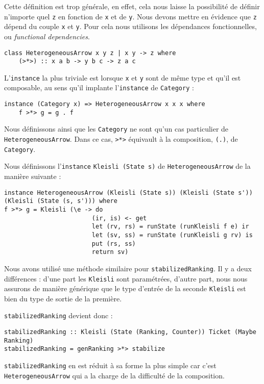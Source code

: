 \documentclass{llncs}
\newcommand{\HA}{\lstinline{HeterogeneousArrow} }
\newcommand{\HAp}{\lstinline{HeterogeneousArrow}. }
\begin{document}
Cette définition est trop générale, en effet, cela nous laisse la possibilité de
définir n'importe quel \lstinline{z} en fonction de \lstinline{x} et de \lstinline{y}.
Nous devons mettre en évidence que \lstinline{z} dépend du couple \lstinline{x} et \lstinline{y}.
Pour cela nous utilisons les dépendances fonctionnelles, ou \emph{functional dependencies}.
\begin{lstlisting}
class HeterogeneousArrow x y z | x y -> z where
    (>*>) :: x a b -> y b c -> z a c
\end{lstlisting}

L'\lstinline{instance} la plus triviale est lorsque \lstinline{x} et \lstinline{y}
sont de même type et qu'il est composable, au sens qu'il implante l'\lstinline{instance}
de \lstinline{Category} :
\begin{lstlisting}
instance (Category x) => HeterogeneousArrow x x x where
    f >*> g = g . f
\end{lstlisting}
Nous définissons ainsi que les \lstinline{Category} ne sont qu'un cas particulier
de \HAp
Dans ce cas, \lstinline{>*>} équivault à la composition, \lstinline{(.)}, de
\lstinline{Category}.

Nous définissons l'\lstinline{instance} \lstinline{Kleisli (State s)} de \HA de 
la manière suivante :
\begin{lstlisting}
instance HeterogeneousArrow (Kleisli (State s)) (Kleisli (State s')) (Kleisli (State (s, s'))) where
f >*> g = Kleisli (\e -> do
                        (ir, is) <- get
                        let (rv, rs) = runState (runKleisli f e) ir
                        let (sv, ss) = runState (runKleisli g rv) is
                        put (rs, ss)
                        return sv)
\end{lstlisting}
Nous avons utilisé une méthode similaire pour \lstinline{stabilizedRanking}.
Il y a deux différences : d'une part les \lstinline{Kleisli} sont paramétrées,
d'autre part, nous nous assurons de manière générique que le type d'entrée de la
seconde \lstinline{Kleisli} est bien du type de sortie de la première.

\lstinline{stabilizedRanking} devient donc :
\begin{lstlisting}
stabilizedRanking :: Kleisli (State (Ranking, Counter)) Ticket (Maybe Ranking)
stabilizedRanking = genRanking >*> stabilize
\end{lstlisting}
\lstinline{stabilizedRanking} en est réduit à sa forme la plus simple car c'est
\HA qui a la charge de la difficulté de la composition.
\end{document}
